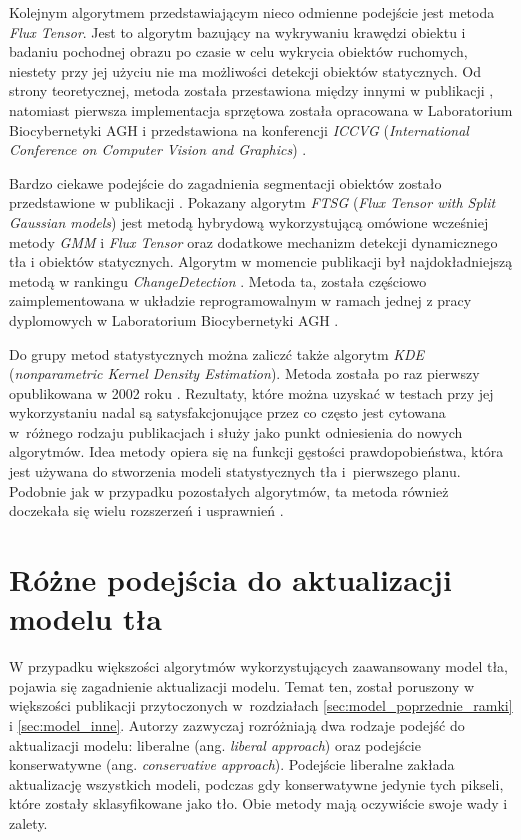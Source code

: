 Kolejnym algorytmem przedstawiającym nieco odmienne podejście jest metoda \textit{Flux Tensor}. Jest to algorytm bazujący na wykrywaniu krawędzi obiektu i badaniu pochodnej obrazu po czasie w celu wykrycia obiektów ruchomych, niestety przy jej użyciu nie ma możliwości detekcji obiektów statycznych. Od strony teoretycznej, metoda została przestawiona między innymi w publikacji \cite{palaniappan_11}, natomiast pierwsza implementacja sprzętowa została opracowana w Laboratorium Biocybernetyki AGH i przedstawiona na konferencji \textit{ICCVG} (\textit{International Conference on Computer Vision and Graphics}) \cite{janus_15, janus_16_flux}. 

Bardzo ciekawe podejście do zagadnienia segmentacji obiektów zostało przedstawione w publikacji \cite{wang_14}. Pokazany algorytm \textit{FTSG} (\textit{Flux Tensor with Split Gaussian models}) jest metodą hybrydową wykorzystującą omówione wcześniej metody \textit{GMM} i \textit{Flux Tensor} oraz dodatkowe mechanizm detekcji dynamicznego tła i obiektów statycznych. Algorytm w momencie publikacji był najdokładniejszą metodą w rankingu \textit{ChangeDetection} \cite{change_detection_web}. Metoda ta, została częściowo zaimplementowana w układzie reprogramowalnym w ramach jednej z pracy dyplomowych w Laboratorium Biocybernetyki AGH \cite{janus_15}.

Do grupy metod statystycznych można zaliczć także algorytm \textit{KDE} (\textit{nonparametric Kernel Density Estimation}). Metoda została po raz pierwszy opublikowana w 2002 roku \cite{elgammal_02}. Rezultaty, które można uzyskać w testach przy jej wykorzystaniu nadal są satysfakcjonujące przez co często jest cytowana w~różnego rodzaju publikacjach i służy jako punkt odniesienia do nowych algorytmów. Idea metody opiera się na funkcji gęstości prawdopobieństwa, która jest używana do stworzenia modeli statystycznych tła i~pierwszego planu. Podobnie jak w przypadku pozostałych algorytmów, ta metoda również doczekała się wielu rozszerzeń i usprawnień \cite{nonaka_12}.

\section{Różne podejścia do aktualizacji modelu tła}
\label{sec:model_tla_aktualizacja}

W przypadku większości algorytmów wykorzystujących zaawansowany model tła, pojawia się zagadnienie aktualizacji modelu. Temat ten, został poruszony w większości publikacji przytoczonych w~rozdziałach \ref{sec:model_poprzednie_ramki} i \ref{sec:model_inne}. Autorzy zazwyczaj rozróżniają dwa rodzaje podejść do aktualizacji modelu: liberalne (ang. \textit{liberal approach}) oraz podejście konserwatywne (ang. \textit{conservative approach}). Podejście liberalne zakłada aktualizację wszystkich modeli, podczas gdy konserwatywne jedynie tych pikseli, które zostały sklasyfikowane jako tło. Obie metody mają oczywiście swoje wady i zalety.

